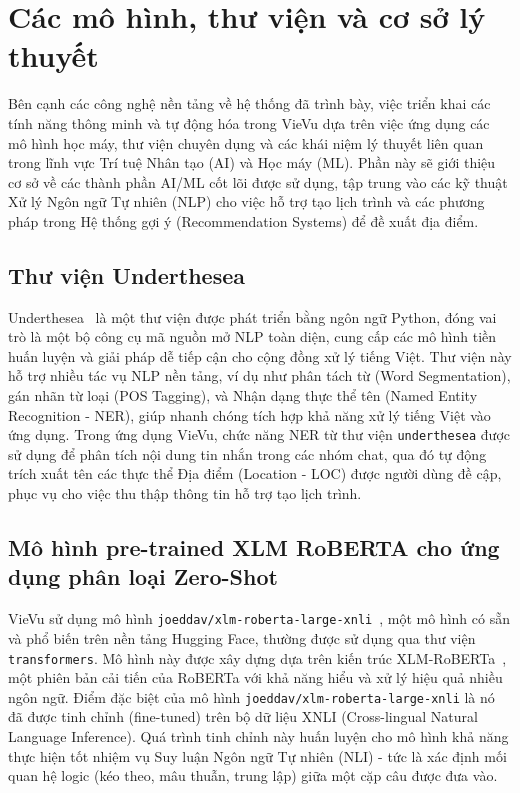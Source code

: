 \section{Các mô hình, thư viện và cơ sở lý thuyết}
Bên cạnh các công nghệ nền tảng về hệ thống đã trình bày, việc triển khai các tính năng thông minh và tự động hóa trong VieVu dựa trên việc ứng dụng các mô hình học máy, thư viện chuyên dụng và các khái niệm lý thuyết liên quan trong lĩnh vực Trí tuệ Nhân tạo (AI) và Học máy (ML). Phần này sẽ giới thiệu cơ sở về các thành phần AI/ML cốt lõi được sử dụng, tập trung vào các kỹ thuật Xử lý Ngôn ngữ Tự nhiên (NLP) cho việc hỗ trợ tạo lịch trình và các phương pháp trong Hệ thống gợi ý (Recommendation Systems) để đề xuất địa điểm.

\subsection{Thư viện Underthesea}

Underthesea~\cite{underthesea_lib} là một thư viện được phát triển bằng ngôn ngữ Python, đóng vai trò là một bộ công cụ mã nguồn mở NLP toàn diện, cung cấp các mô hình tiền huấn luyện và giải pháp dễ tiếp cận cho cộng đồng xử lý tiếng Việt. Thư viện này hỗ trợ nhiều tác vụ NLP nền tảng, ví dụ như phân tách từ (Word Segmentation), gán nhãn từ loại (POS Tagging), và Nhận dạng thực thể tên (Named Entity Recognition - NER), giúp nhanh chóng tích hợp khả năng xử lý tiếng Việt vào ứng dụng. Trong ứng dụng VieVu, chức năng NER từ thư viện \texttt{underthesea} được sử dụng để phân tích nội dung tin nhắn trong các nhóm chat, qua đó tự động trích xuất tên các thực thể Địa điểm (Location - LOC) được người dùng đề cập, phục vụ cho việc thu thập thông tin hỗ trợ tạo lịch trình.

\subsection{Mô hình pre-trained XLM RoBERTA cho ứng dụng phân loại Zero-Shot}

VieVu sử dụng mô hình \texttt{joeddav/xlm-roberta-large-xnli}~\cite{xlm_roberta_xnli_model}, một mô hình có sẵn và phổ biến trên nền tảng Hugging Face, thường được sử dụng qua thư viện \texttt{transformers}. Mô hình này được xây dựng dựa trên kiến trúc XLM-RoBERTa~\cite{xlm_roberta_paper}, một phiên bản cải tiến của RoBERTa với khả năng hiểu và xử lý hiệu quả nhiều ngôn ngữ. Điểm đặc biệt của mô hình \texttt{joeddav/xlm-roberta-large-xnli} là nó đã được tinh chỉnh (fine-tuned) trên bộ dữ liệu XNLI (Cross-lingual Natural Language Inference). Quá trình tinh chỉnh này huấn luyện cho mô hình khả năng thực hiện tốt nhiệm vụ Suy luận Ngôn ngữ Tự nhiên (NLI) - tức là xác định mối quan hệ logic (kéo theo, mâu thuẫn, trung lập) giữa một cặp câu được đưa vào.
 
